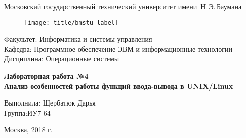 
\thispagestyle{empty}

\begin{center}
    \Large
    Московский государственный технический университет имени~Н.\,Э.\,Баумана
\end{center}

\begin{figure}[h!]
    \begin{center}
        \texttt{[image: title/bmstu\_label]}
    \end{center}
\end{figure}

{\large
\noindent
Факультет: Информатика и системы управления\\[2mm]
\noindent
Кафедра: Программное обеспечение ЭВМ и информационные технологии\\[2mm]
\noindent
Дисциплина: Операционные системы
\vspace{1.5cm}}

\begin{center}
    \Large
    \textbf{Лабораторная работа №4} \\
    \textbf{Анализ особенностей работы функций ввода-вывода в UNIX/Linux} \\
\end{center}
\vfill

\hfill\begin{minipage}{0.35\textwidth}
    Выполнила: Щербатюк Дарья\\
    Группа:ИУ7-64 \\
\end{minipage}
\vfill

\begin{center}
    Москва, 2018 г.
\end{center}